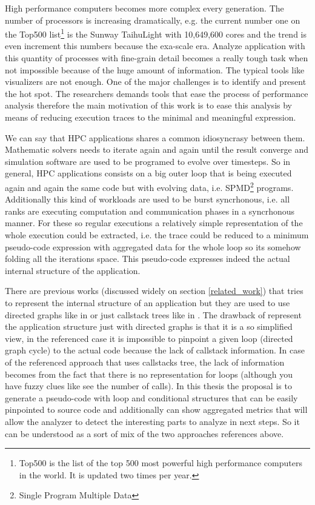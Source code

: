 High performance computers becomes more complex every generation. The number of 
processors is increasing dramatically, e.g. the current number one on the Top500
 list\footnote{Top500 is the list of the top 500 most powerful high performance 
computers in the world. It is updated two times per year.} is the Sunway TaihuLight 
with 10,649,600 cores\cite{top500_2017} and the trend is even increment this
numbers because the exa-scale era. Analyze application with this quantity 
of processes with fine-grain detail becomes a really tough task when not
impossible because of the huge amount of information. The typical tools like 
visualizers are not enough. One of the major challenges is to
identify and present the hot spot. The researchers demands tools that ease the 
process of performance analysis therefore the main motivation of this work is to ease 
this analysis by means of reducing execution traces to the minimal and meaningful 
expression.

We can say that HPC applications shares a common idiosyncrasy between them. 
Mathematic solvers needs to iterate again and again until the result converge and 
simulation software are used to be programed to evolve over timesteps. So in 
general, HPC applications consists on a big outer loop that is being executed 
again and again the same code but with evolving data, i.e. SPMD\footnote{Single
Program Multiple Data} programs. Additionally this kind of workloads are used
to be burst syncrhonous, i.e. all ranks are executing computation and
communication phases in a syncrhonous manner. For these so regular executions a
relatively simple representation of the whole execution could be extracted, i.e.
the trace could be reduced to a minimum pseudo-code expression
with aggregated data for the whole loop so its somehow folding all the iterations
space. This pseudo-code expresses indeed the actual internal structure of the 
application.

There are previous works (discussed widely on section \ref{related_work})  that 
tries to represent the internal structure of an application but they are used to
use directed graphs like in \cite{aguilar2016event} or just callstack trees like
in \cite{saviankou2015cube}. The drawback of represent the application structure
just with directed graphs is that it is a so simplified view, in the referenced
case it is impossible to pinpoint a given loop (directed graph cycle) to the
actual code because the lack of callstack information. In case of the
referenced approach that uses callstacks tree, the lack of information becomes
from the fact that there is no representation for loops (although you have fuzzy
clues like see the number of calls). In this thesis the proposal is to 
generate a pseudo-code with loop and conditional structures that can be easily 
pinpointed to source code and additionally can show aggregated metrics
that will allow the analyzer to detect the interesting parts to analyze in next
steps. So it can be understood as a sort of mix of the two approaches references
above.

